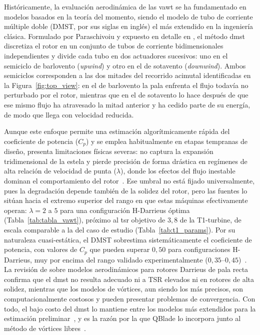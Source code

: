Históricamente, la evaluación aerodinámica de las \gls{vawt} se ha fundamentado en modelos basados en la teoría del momento, siendo el modelo de tubo de corriente múltiple doble (DMST, por sus siglas en inglés) el más extendido en la ingeniería clásica. Formulado por Paraschivoiu y expuesto en detalle en \textcite{Paraschivoiu2002}, el método \gls{dmst} discretiza el rotor en un conjunto de tubos de corriente bidimensionales independientes y divide cada tubo en dos actuadores sucesivos: uno en el semiciclo de barlovento (\textit{upwind}) y otro en el de sotavento (\textit{downwind}). Ambos semiciclos corresponden a las dos mitades del recorrido acimutal identificadas en la Figura~\ref{fig:top_view}: en el de barlovento la pala enfrenta el flujo todavía no perturbado por el rotor, mientras que en el de sotavento lo hace después de que ese mismo flujo ha atravesado la mitad anterior y ha cedido parte de su energía, de modo que llega con velocidad reducida.

Aunque este enfoque permite una estimación algorítmicamente rápida del coeficiente de potencia ($C_p$) y se emplea habitualmente en etapas tempranas de diseño, presenta limitaciones físicas severas: no captura la expansión tridimensional de la estela y pierde precisión de forma drástica en regímenes de alta relación de velocidad de punta ($\lambda$), donde los efectos del flujo inestable dominan el comportamiento del rotor~\parencite{Galinos2015,Tchakoua2015}. Ese umbral no está fijado universalmente, pues la degradación depende también de la solidez del rotor, pero las fuentes lo sitúan hacia el extremo superior del rango en que estas máquinas efectivamente operan: $\lambda = 2$ a $5$ para una configuración H-Darrieus óptima (Tabla~\ref{tab:tabla_vawt}), próximo al \gls{tsr} objetivo de $3{,}8$ de la T1-turbine, de escala comparable a la del caso de estudio (Tabla~\ref{tab:t1_params}). Por su naturaleza cuasi-estática, el DMST sobrestima sistemáticamente el coeficiente de potencia, con valores de $C_p$ que pueden superar $0{,}50$ para configuraciones H-Darrieus, muy por encima del rango validado experimentalmente ($0{,}35\text{--}0{,}45$)~\parencite{Essahraoui2026}. La revisión de \textcite{Islam2008} sobre modelos aerodinámicos para rotores Darrieus de pala recta confirma que el \gls{dmst} no resulta adecuado ni a TSR elevados ni en rotores de alta solidez, mientras que los modelos de vórtices, aun siendo los más precisos, son computacionalmente costosos y pueden presentar problemas de convergencia. Con todo, el bajo costo del \gls{dmst} lo mantiene entre los modelos más extendidos para la estimación preliminar~\parencite{Islam2008}, y es la razón por la que QBlade lo incorpora junto al método de vórtices libres~\parencite{marten2019qblade}.

